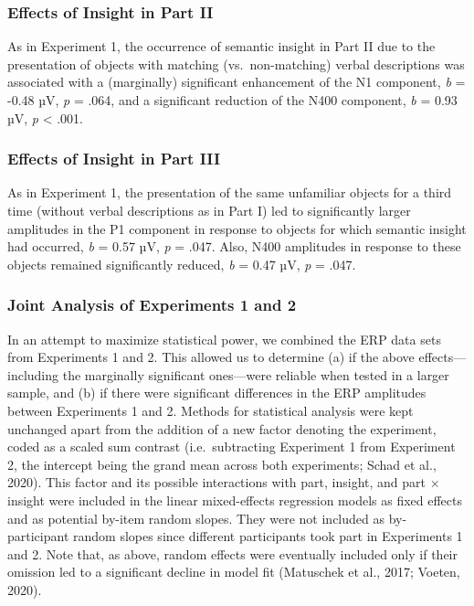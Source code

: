 \documentclass[
  english,
  man,11pt,floatsintext]{apa7}
\begin{document}
\hypertarget{effects-of-insight-in-part-ii-1}{%
\subsubsection{Effects of Insight in Part II}\label{effects-of-insight-in-part-ii-1}}

As in Experiment 1, the occurrence of semantic insight in Part II due to the presentation of objects with matching (vs.~non-matching) verbal descriptions was associated with a (marginally) significant enhancement of the N1 component, \emph{b} = -0.48 µV, \emph{p} = .064, and a significant reduction of the N400 component, \emph{b} = 0.93 µV, \emph{p} \textless{} .001.

\hypertarget{effects-of-insight-in-part-iii-1}{%
\subsubsection{Effects of Insight in Part III}\label{effects-of-insight-in-part-iii-1}}

As in Experiment 1, the presentation of the same unfamiliar objects for a third time (without verbal descriptions as in Part I) led to significantly larger amplitudes in the P1 component in response to objects for which semantic insight had occurred, \emph{b} = 0.57 µV, \emph{p} = .047. Also, N400 amplitudes in response to these objects remained significantly reduced, \emph{b} = 0.47 µV, \emph{p} = .047.

\hypertarget{joint-analysis-of-experiments-1-and-2}{%
\subsubsection{Joint Analysis of Experiments 1 and 2}\label{joint-analysis-of-experiments-1-and-2}}

In an attempt to maximize statistical power, we combined the ERP data sets from Experiments 1 and 2. This allowed us to determine (a) if the above effects---including the marginally significant ones---were reliable when tested in a larger sample, and (b) if there were significant differences in the ERP amplitudes between Experiments 1 and 2. Methods for statistical analysis were kept unchanged apart from the addition of a new factor denoting the experiment, coded as a scaled sum contrast (i.e.~subtracting Experiment 1 from Experiment 2, the intercept being the grand mean across both experiments; Schad et al., 2020). This factor and its possible interactions with part, insight, and part × insight were included in the linear mixed-effects regression models as fixed effects and as potential by-item random slopes. They were not included as by-participant random slopes since different participants took part in Experiments 1 and 2. Note that, as above, random effects were eventually included only if their omission led to a significant decline in model fit (Matuschek et al., 2017; Voeten, 2020).
\end{document}
